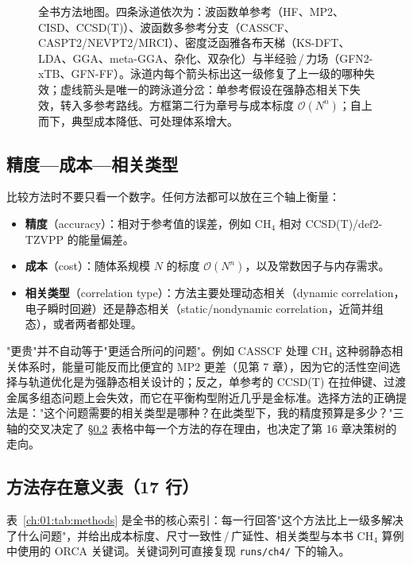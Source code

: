 \begin{figure}[t]
\caption{全书方法地图。四条泳道依次为：波函数单参考（HF、MP2、CISD、CCSD(T)）、波函数多参考分支（CASSCF、CASPT2/NEVPT2/MRCI）、密度泛函雅各布天梯（KS-DFT、LDA、GGA、meta-GGA、杂化、双杂化）与半经验\,/\,力场（GFN2-xTB、GFN-FF）。泳道内每个箭头标出这一级修复了上一级的哪种失效；虚线箭头是唯一的跨泳道分岔：单参考假设在强静态相关下失效，转入多参考路线。方框第二行为章号与成本标度 $\mathcal{O}(N^n)$；自上而下，典型成本降低、可处理体系增大。}
\label{ch:01:fig:map}
\end{figure}

\subsection{精度—成本—相关类型}
\label{ch:01:sec:three-axes}

比较方法时不要只看一个数字。任何方法都可以放在三个轴上衡量：

\begin{itemize}
  \item \textbf{精度}（accuracy）：相对于参考值的误差，例如 CH$_4$ 相对 CCSD(T)/def2-TZVPP 的能量偏差。
  \item \textbf{成本}（cost）：随体系规模 $N$ 的标度 $\mathcal{O}(N^n)$，以及常数因子与内存需求。
  \item \textbf{相关类型}（correlation type）：方法主要处理动态相关（dynamic correlation，电子瞬时回避）还是静态相关（static/nondynamic correlation，近简并组态），或者两者都处理。
\end{itemize}

"更贵"并不自动等于"更适合所问的问题"。例如 CASSCF 处理 CH$_4$ 这种弱静态相关体系时，能量可能反而比便宜的 MP2 更差（见第 7 章），因为它的活性空间选择与轨道优化是为强静态相关设计的；反之，单参考的 CCSD(T) 在拉伸键、过渡金属多组态问题上会失效，而它在平衡构型附近几乎是金标准。选择方法的正确提法是："这个问题需要的相关类型是哪种？在此类型下，我的精度预算是多少？"三轴的交叉决定了 \S\ref{ch:01:sec:method-table} 表格中每一个方法的存在理由，也决定了第 16 章决策树的走向。

\subsection{方法存在意义表（17 行）}
\label{ch:01:sec:method-table}

表~\ref{ch:01:tab:methods} 是全书的核心索引：每一行回答"这个方法比上一级多解决了什么问题"，并给出成本标度、尺寸一致性\,/\,广延性、相关类型与本书 CH$_4$ 算例中使用的 ORCA 关键词。关键词列可直接复现 \texttt{runs/ch4/} 下的输入。

